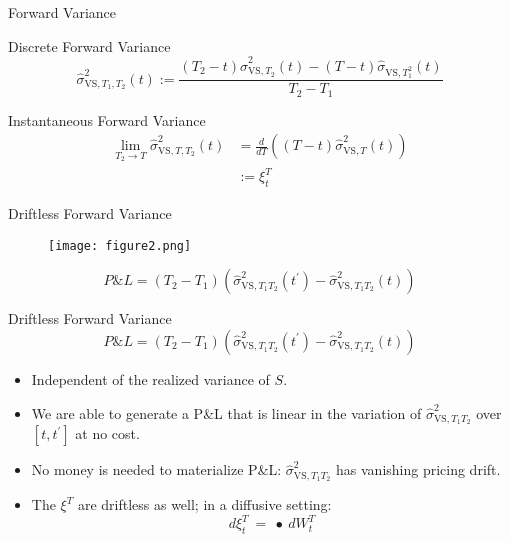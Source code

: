 \documentclass{beamer}
\begin{document}
        \begin{frame}{Forward Variance}
        \begin{block}{Discrete Forward Variance}
            \[\widehat{\sigma}_{\text{VS},T_{1},T_{2}}^{2}\left(t\right):=\frac{\left(T_{2}-t \right)\widehat{\sigma}_{\text{VS},T_{2}}^{2}\left(t\right)-\left(T-t \right)\widehat{\sigma}_{\text{VS},T_{1}^{2}}\left(t\right)}{T_{2}-T_{1}}\]
        \end{block}
            \begin{block}{Instantaneous Forward Variance}
            \begin{align*}
                \lim_{T_{2} \rightarrow T}\widehat{\sigma}_{\text{VS},T,T_{2}}^{2}(t) & = \frac{d}{dT}\left(\left(T-t\right)\widehat{\sigma}_{\text{VS},T}^ {2}\left(t\right)\right)\\
                &:= \xi_{t}^{T}                 
            \end{align*}

            \end{block}
        \end{frame}

        
        \begin{frame}{Driftless Forward Variance}
            \begin{figure}
                \centering
                \texttt{[image: figure2.png]}
                \label{fig:2}
            \end{figure}
             \[P\&L = \left(T_{2}-T_{1}\right)\left(\widehat{\sigma}_{\text{VS},T_{1}T_{2}}^{2} \left(t^{\prime}\right)-\widehat{\sigma}_{\text{VS},T_{1}T_{2}}^{2}\left(t \right)\right) \]  
        \end{frame}

        \begin{frame}{Driftless Forward Variance}
        \[P\&L = \left(T_{2}-T_{1}\right)\left(\widehat{\sigma}_{\text{VS},T_{1}T_{2}}^{2} \left(t^{\prime}\right)-\widehat{\sigma}_{\text{VS},T_{1}T_{2}}^{2}\left(t \right)\right) \]  
            \begin{itemize}
                \item Independent of the realized variance of $S$.
                \item We are able to generate a P\&L that is linear in the variation of \(\widehat{\sigma}_{\text{VS},T_{1}T_{2}}^{2}\) over \(\left[t,t^{\prime}\right]\) at no cost.
                \item  No money is needed to materialize P\&L: \(\widehat{\sigma}_{\text{VS},T_{1}T_{2}}^{2}\) has vanishing pricing drift.
                \item The \(\xi^{T}\) are driftless as well; in a diffusive setting:\[d\xi_{t}^{T}\ =\ \bullet \ dW_{t}^{T}\]
            \end{itemize}
        \end{frame}
    
\end{document}
